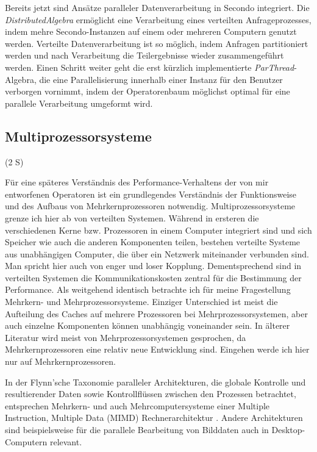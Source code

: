 \documentclass[a4paper,12pt,twoside]{article}
\newcommand{\Fb}[1]{\textit{#1}} %
\begin{document}
Bereits jetzt sind Ansätze paralleler Datenverarbeitung in Secondo integriert. Die \Fb{DistributedAlgebra} \parencite{Nidzwetzki2017} ermöglicht eine Verarbeitung eines verteilten Anfrageprozesses, indem mehre Secondo-Instanzen auf einem oder mehreren Computern genutzt werden. Verteilte Datenverarbeitung ist so möglich, indem Anfragen partitioniert werden und nach Verarbeitung die Teilergebnisse wieder zusammengeführt werden. Einen Schritt weiter geht die erst kürzlich implementierte \Fb{ParThread}-Algebra, die eine Parallelisierung innerhalb einer Instanz für den Benutzer verborgen vornimmt, indem der Operatorenbaum möglichst optimal für eine parallele Verarbeitung umgeformt wird.

\subsection{Multiprozessorsysteme} (2 S)

Für eine späteres Verständnis des Performance-Verhaltens der von mir entworfenen Operatoren ist ein grundlegendes Verständnis der Funktionsweise und des Aufbaus von Mehrkernprozessoren notwendig. Multiprozessorsysteme grenze ich hier ab von verteilten Systemen. Während in ersteren die verschiedenen Kerne bzw. Prozessoren in einem Computer integriert sind und sich Speicher wie auch die anderen Komponenten teilen, bestehen verteilte Systeme aus unabhängigen Computer, die über ein Netzwerk miteinander verbunden sind. Man spricht hier auch von enger und loser Kopplung. Dementsprechend sind in verteilten Systemen die Kommunikationskosten zentral für die Bestimmung der Performance. Als weitgehend identisch betrachte ich für meine Fragestellung Mehrkern- und Mehrprozessorsysteme. Einziger Unterschied ist meist die Aufteilung des Caches auf mehrere Prozessoren bei Mehrprozessorsystemen, aber auch einzelne Komponenten können unabhängig voneinander sein. In älterer Literatur wird meist von Mehrprozessorsystemen gesprochen, da Mehrkernprozessoren eine relativ neue Entwicklung sind. Eingehen werde ich hier nur auf Mehrkernprozessoren.

In der Flynn’sche Taxonomie paralleler Architekturen, die globale Kontrolle und resultierender Daten sowie Kontrollflüssen zwischen den Prozessen betrachtet, entsprechen Mehrkern- und auch Mehrcomputersysteme einer Multiple Instruction, Multiple Data (MIMD) Rechnerarchitektur \parencite[S. 10f]{Rauber2013}. Andere Architekturen sind beispielsweise für die parallele Bearbeitung von Bilddaten auch in Desktop-Computern relevant.
\end{document}
